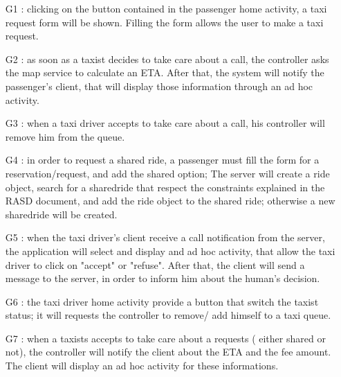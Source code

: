\begin{itemize}
 \item[G1]: clicking on the button contained in the passenger home activity, a taxi request form will be shown. 
  Filling the form allows the user to make a taxi request.
 \item[G2]: as soon as a taxist decides to take care about a call, the controller asks the map service to calculate an ETA. 
 After that, the system will notify the passenger's client, that will display those information through an ad hoc activity.
 \item[G3]: when a taxi driver accepts to take care about a call, his controller will remove him from the queue.
 \item[G4]: in order to request a shared ride, a passenger must fill the form for a reservation/request, and add the shared option;
 The server will create a ride object, search for a sharedride that respect the constraints explained in the RASD document,
 and add the ride object to the shared ride; otherwise a new sharedride will be created.
 \item[G5]: when the taxi driver's client receive a call notification from the server, the application will select and display 
 and ad hoc activity, that allow the taxi driver to click on "accept" or "refuse". After that, the client will send a message to the
 server, in order to inform him about the human's decision.
 \item[G6]: the taxi driver home activity provide a button that switch the taxist status; it will requests the controller to 
 remove/ add himself to a taxi queue.
 \item[G7]: when a taxists accepts to take care about a requests ( either shared or not), the controller will notify the client about
 the ETA and the fee amount. The client will display an ad hoc activity for these informations. 
\end{itemize}

